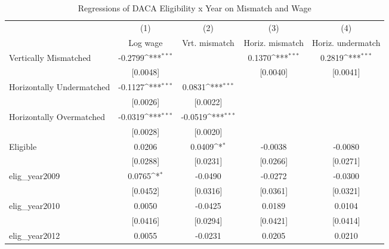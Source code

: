 \begin{table}[htbp]\centering
\def\sym#1{\ifmmode^{#1}\else\(^{#1}\)\fi}
\caption{Regressions of DACA Eligibility x Year on Mismatch and Wage}
\begin{tabular}{l*{4}{c}}
\toprule
                    &\multicolumn{1}{c}{(1)}         &\multicolumn{1}{c}{(2)}         &\multicolumn{1}{c}{(3)}         &\multicolumn{1}{c}{(4)}         \\
                    &    Log wage         &Vrt. mismatch         &Horiz. mismatch         &Horiz. undermatch         \\
\midrule
Vertically Mismatched&     -0.2799\sym{***}&                     &      0.1370\sym{***}&      0.2819\sym{***}\\
                    &    [0.0048]         &                     &    [0.0040]         &    [0.0041]         \\
\addlinespace
Horizontally Undermatched&     -0.1127\sym{***}&      0.0831\sym{***}&                     &                     \\
                    &    [0.0026]         &    [0.0022]         &                     &                     \\
\addlinespace
Horizontally Overmatched&     -0.0319\sym{***}&     -0.0519\sym{***}&                     &                     \\
                    &    [0.0028]         &    [0.0020]         &                     &                     \\
\addlinespace
Eligible            &      0.0206         &      0.0409\sym{*}  &     -0.0038         &     -0.0080         \\
                    &    [0.0288]         &    [0.0231]         &    [0.0266]         &    [0.0271]         \\
\addlinespace
elig\_year2009       &      0.0765\sym{*}  &     -0.0490         &     -0.0272         &     -0.0300         \\
                    &    [0.0452]         &    [0.0316]         &    [0.0361]         &    [0.0321]         \\
\addlinespace
elig\_year2010       &      0.0050         &     -0.0425         &      0.0189         &      0.0104         \\
                    &    [0.0416]         &    [0.0294]         &    [0.0421]         &    [0.0414]         \\
\addlinespace
elig\_year2012       &      0.0055         &     -0.0231         &      0.0205         &      0.0210         \\

\end{tabular}
\end{table}
